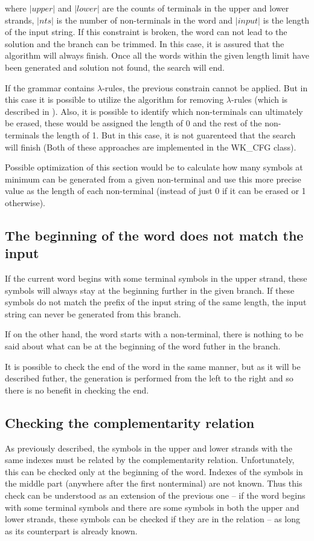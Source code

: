 where $|upper|$ and $|lower|$ are the counts of terminals in the upper and lower strands, $|nts|$ is the number of non-terminals in the word and $|input|$ is the length of the input string. If this constraint is broken, the word can not lead to the solution and the branch can be trimmed.
In this case, it is assured that the algorithm will always finish. Once all the words within the given length limit have been generated and solution not found, the search will end.

If the grammar contains $\lambda$-rules, the previous constrain cannot be applied. But in this case it is possible to utilize the algorithm for removing $\lambda$-rules (which is described in \cite{WK_CYK}). Also, it is possible to identify which non-terminals can ultimately be erased, these would be assigned the length of 0 and the rest of the non-terminals the length of 1. But in this case, it is not guarenteed that the search will finish (Both of these approaches are implemented in the WK\_CFG class).

Possible optimization of this section would be to calculate how many symbols at minimum can be generated from a given non-terminal and use this more precise value as the length of each non-terminal (instead of just 0 if it can be erased or 1 otherwise).

\subsection{The beginning of the word does not match the input}
If the current word begins with some terminal symbols in the upper strand, these symbols will always stay at the beginning further in the given branch. If these symbols do not match the prefix of the input string of the same length, the input string can never be generated from this branch.

If on the other hand, the word starts with a non-terminal, there is nothing to be said about what can be at the beginning of the word futher in the branch.

It is possible to check the end of the word in the same manner, but as it will be described futher, the generation is performed from the left to the right and so there is no benefit in checking the end.

\subsection{Checking the complementarity relation}
As previously described, the symbols in the upper and lower strands with the same indexes must be related by the complementarity relation. Unfortunately, this can be checked only at the beginning of the word. Indexes of the symbols in the middle part (anywhere after the first nonterminal) are not known. Thus this check can be understood as an extension of the previous one -- if the word begins with some terminal symbols and there are some symbols in both the upper and lower strands, these symbols can be checked if they are in the relation -- as long as its counterpart is already known.

